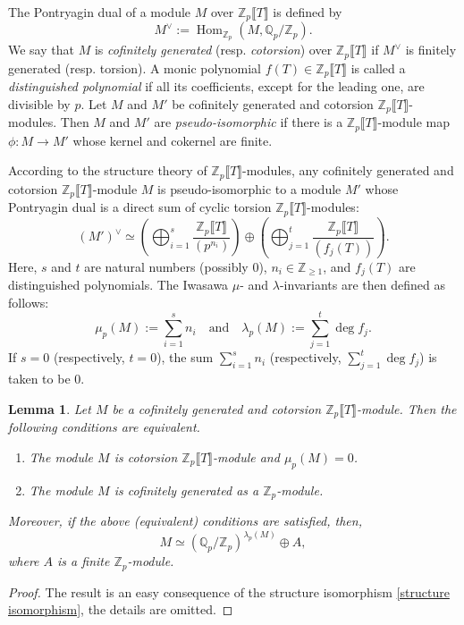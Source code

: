 \documentclass[12pt]{amsart}
\newtheorem{lemma}[theorem]{Lemma}
\newcommand{\Z}{\mathbb{Z}}
\newcommand{\Q}{\mathbb{Q}}
\newcommand{\op}[1]{\operatorname{#1}}
\numberwithin{equation}{section}
\begin{document}
\par The Pontryagin dual of a module $M$ over $\Z_p\llbracket T\rrbracket$ is defined by \[M^\vee:=\op{Hom}_{\Z_p}\left(M, \Q_p/\Z_p\right).\] We say that $M$ is \emph{cofinitely generated} (resp. \emph{cotorsion}) over $\Z_p\llbracket T\rrbracket$ if $M^\vee$ is finitely generated (resp. torsion). A monic polynomial $ f(T) \in \mathbb{Z}_p\llbracket T \rrbracket $ is called a \textit{distinguished polynomial} if all its coefficients, except for the leading one, are divisible by $ p $. Let $ M $ and $ M' $ be cofinitely generated and cotorsion $\mathbb{Z}_p\llbracket T\rrbracket$-modules. Then $ M $ and $ M' $ are \textit{pseudo-isomorphic} if there is a $\mathbb{Z}_p\llbracket T \rrbracket $-module map $\phi: M \rightarrow M'$ whose kernel and cokernel are finite.

\par According to the structure theory of $\Z_p\llbracket T\rrbracket$-modules, any cofinitely generated and cotorsion $\Z_p\llbracket T\rrbracket$-module $ M $ is pseudo-isomorphic to a module $ M' $ whose Pontryagin dual is a direct sum of cyclic torsion $\Z_p\llbracket T\rrbracket$-modules:
\begin{equation}\label{structure isomorphism}
(M')^\vee \simeq \left( \bigoplus_{i=1}^s \frac{\Z_p\llbracket T\rrbracket}{(p^{n_i})} \right) \oplus \left( \bigoplus_{j=1}^t \frac{\Z_p\llbracket T\rrbracket}{(f_j(T))} \right).
\end{equation}
Here, $ s $ and $ t $ are natural numbers (possibly $ 0 $), $ n_i \in \mathbb{Z}_{\geq 1} $, and $ f_j(T) $ are distinguished polynomials. The Iwasawa $\mu$- and $\lambda$-invariants are then defined as follows:
\[
\mu_p(M) := \sum_{i=1}^s n_i \quad \text{and} \quad \lambda_p(M) := \sum_{j=1}^t \deg f_j.
\]
If $ s = 0 $ (respectively, $ t = 0 $), the sum $\sum_{i=1}^s n_i$ (respectively, $\sum_{j=1}^t \deg f_j$) is taken to be $ 0 $. 
\begin{lemma}\label{basic lemma on lambda and corank}
    Let $M$ be a cofinitely generated and cotorsion $\Z_p\llbracket T\rrbracket$-module. Then the following conditions are equivalent. 
    \begin{enumerate}
        \item The module $M$ is cotorsion $\mathbb{Z}_p\llbracket T\rrbracket $-module and $\mu_p(M)=0$. 
        \item The module $M$ is cofinitely generated as a $\Z_p$-module. 
    \end{enumerate}
    Moreover, if the above (equivalent) conditions are satisfied, then, \[M\simeq \left(\Q_p/\Z_p\right)^{\lambda_p(M)}\oplus A,\] where $A$ is a finite $\Z_p$-module. 
\end{lemma}
\begin{proof}
    The result is an easy consequence of the structure isomorphism \eqref{structure isomorphism}, the details are omitted. 
\end{proof}
\end{document}
